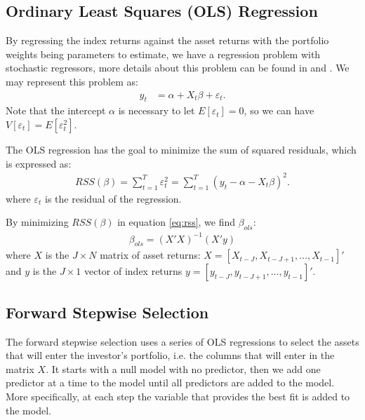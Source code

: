 \documentclass[preprint, doubleblind, authoryear,10pt]{elsarticle}
\begin{document}
\subsection{Ordinary Least Squares (OLS) Regression}

By regressing the index returns against the asset returns with the portfolio weights being parameters to estimate, we have a regression problem with stochastic regressors, more details about this problem can be found in \cite{rao-2008} and \cite{rencher-2007}.
We may represent this problem as:
\begin{align*} 
	y_{t} &= \alpha + X_{t}\beta + \varepsilon_{t}.
\end{align*}
Note that the intercept $\alpha$ is necessary to let $E[\varepsilon_{t}]=0$, so we can have $V[\varepsilon_{t}] = E[\varepsilon_{t}^2]$.

The OLS regression has the goal to minimize the sum of squared residuals, which is expressed as:
\begin{align} \label{eq:rss}
	RSS(\beta)
	= \sum_{t=1}^{T} \varepsilon_t^2
	= \sum_{t=1}^{T} (y_t - \alpha - X_t \beta)^2.
\end{align}
where $\varepsilon_{t}$ is the residual of the regression.

By minimizing $RSS(\beta)$ in equation \eqref{eq:rss}, we find $\beta_{ols}$:
\begin{align} 
	\label{eq:bols}
	\beta_{ols} = (X'X)^{-1}(X'y)
\end{align}
where $X$ is the $J \times N$ matrix of asset returns: $X = [X_{t-J}, X_{t-J+1}, \dots , X_{t-1}]'$ and $y$ is the $J\times 1$ vector of index returns $y = [y_{t-J}, y_{t-J+1}, \dots , y_{t-1}]'$.

\subsection{Forward Stepwise Selection}

The forward stepwise selection uses a series of OLS regressions to select the assets that will enter the investor's portfolio, i.e. the columns that will enter in the matrix $X$.
It starts with a null model with no predictor, then we add one predictor at a time to the model until all predictors are added to the model.
More specifically, at each step the variable that provides the best fit is added to the model.
\end{document}
